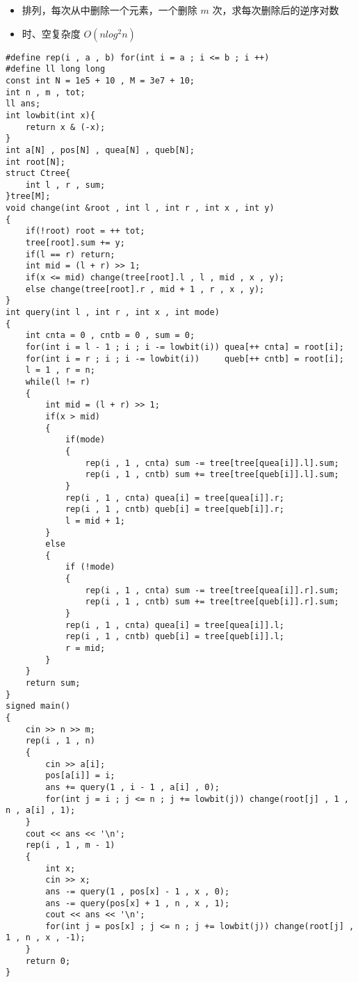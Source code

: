 \documentclass[E:/GsjzTle/main/main.tex]{subfiles}
\begin{document}
\begin{itemize}
\item
  排列，每次从中删除一个元素，一个删除 \(m\) 次，求每次删除后的逆序对数
\item
  时、空复杂度 \(O(nlog^2n)\)
\end{itemize}

\begin{lstlisting}
#define rep(i , a , b) for(int i = a ; i <= b ; i ++)
#define ll long long
const int N = 1e5 + 10 , M = 3e7 + 10;
int n , m , tot;
ll ans;
int lowbit(int x){
	return x & (-x);
}
int a[N] , pos[N] , quea[N] , queb[N];
int root[N];
struct Ctree{
	int l , r , sum;
}tree[M];
void change(int &root , int l , int r , int x , int y)
{
	if(!root) root = ++ tot;
	tree[root].sum += y;
	if(l == r) return;
	int mid = (l + r) >> 1;
	if(x <= mid) change(tree[root].l , l , mid , x , y);
	else change(tree[root].r , mid + 1 , r , x , y);
}
int query(int l , int r , int x , int mode)
{
	int cnta = 0 , cntb = 0 , sum = 0;
	for(int i = l - 1 ; i ; i -= lowbit(i)) quea[++ cnta] = root[i];
	for(int i = r ; i ; i -= lowbit(i)) 	queb[++ cntb] = root[i];
	l = 1 , r = n;
	while(l != r)
	{
		int mid = (l + r) >> 1;
		if(x > mid)
		{
			if(mode)
			{
				rep(i , 1 , cnta) sum -= tree[tree[quea[i]].l].sum;
				rep(i , 1 , cntb) sum += tree[tree[queb[i]].l].sum;
			}
			rep(i , 1 , cnta) quea[i] = tree[quea[i]].r;
			rep(i , 1 , cntb) queb[i] = tree[queb[i]].r;
			l = mid + 1;
		}
		else
		{
			if (!mode)
			{
				rep(i , 1 , cnta) sum -= tree[tree[quea[i]].r].sum;
				rep(i , 1 , cntb) sum += tree[tree[queb[i]].r].sum;
			}
			rep(i , 1 , cnta) quea[i] = tree[quea[i]].l;
			rep(i , 1 , cntb) queb[i] = tree[queb[i]].l;
			r = mid;
		}
	}
	return sum;
}
signed main()
{
	cin >> n >> m;
	rep(i , 1 , n)
	{
		cin >> a[i];
		pos[a[i]] = i;
		ans += query(1 , i - 1 , a[i] , 0);
		for(int j = i ; j <= n ; j += lowbit(j)) change(root[j] , 1 , n , a[i] , 1);
	}
	cout << ans << '\n';
	rep(i , 1 , m - 1)
	{
		int x;
		cin >> x;
		ans -= query(1 , pos[x] - 1 , x , 0);
		ans -= query(pos[x] + 1 , n , x , 1);
		cout << ans << '\n';
		for(int j = pos[x] ; j <= n ; j += lowbit(j)) change(root[j] , 1 , n , x , -1);
	}
	return 0;
}
\end{lstlisting}
\end{document}
